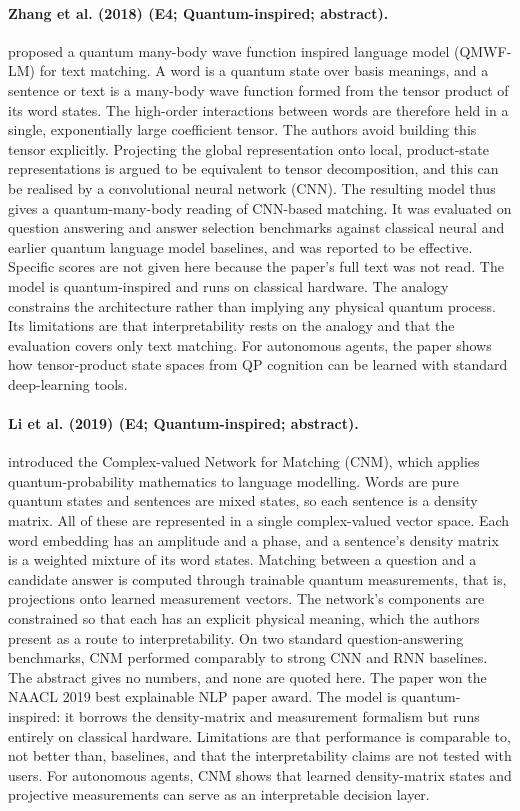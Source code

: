 \documentclass[10pt,a4paper]{article}
\begin{document}
\paragraph{Zhang et al. (2018) (E4; Quantum-inspired; abstract).} \citet{Zhang2018} proposed a quantum many-body wave function inspired language model (QMWF-LM) for text matching. A word is a quantum state over basis meanings, and a sentence or text is a many-body wave function formed from the tensor product of its word states. The high-order interactions between words are therefore held in a single, exponentially large coefficient tensor. The authors avoid building this tensor explicitly. Projecting the global representation onto local, product-state representations is argued to be equivalent to tensor decomposition, and this can be realised by a convolutional neural network (CNN). The resulting model thus gives a quantum-many-body reading of CNN-based matching. It was evaluated on question answering and answer selection benchmarks against classical neural and earlier quantum language model baselines, and was reported to be effective. Specific scores are not given here because the paper's full text was not read. The model is quantum-inspired and runs on classical hardware. The analogy constrains the architecture rather than implying any physical quantum process. Its limitations are that interpretability rests on the analogy and that the evaluation covers only text matching. For autonomous agents, the paper shows how tensor-product state spaces from QP cognition can be learned with standard deep-learning tools.

\paragraph{Li et al. (2019) (E4; Quantum-inspired; abstract).} \citet{Li2019} introduced the Complex-valued Network for Matching (CNM), which applies quantum-probability mathematics to language modelling. Words are pure quantum states and sentences are mixed states, so each sentence is a density matrix. All of these are represented in a single complex-valued vector space. Each word embedding has an amplitude and a phase, and a sentence's density matrix is a weighted mixture of its word states. Matching between a question and a candidate answer is computed through trainable quantum measurements, that is, projections onto learned measurement vectors. The network's components are constrained so that each has an explicit physical meaning, which the authors present as a route to interpretability. On two standard question-answering benchmarks, CNM performed comparably to strong CNN and RNN baselines. The abstract gives no numbers, and none are quoted here. The paper won the NAACL 2019 best explainable NLP paper award. The model is quantum-inspired: it borrows the density-matrix and measurement formalism but runs entirely on classical hardware. Limitations are that performance is comparable to, not better than, baselines, and that the interpretability claims are not tested with users. For autonomous agents, CNM shows that learned density-matrix states and projective measurements can serve as an interpretable decision layer.
\end{document}
